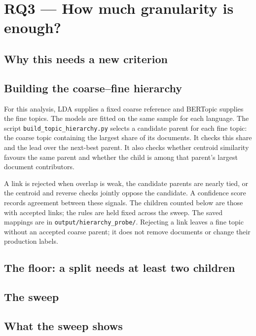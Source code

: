 \section{RQ3 --- How much granularity is enough?}
\label{sec:rq3}

\subsection{Why this needs a new criterion}

\subsection{Building the coarse--fine hierarchy}
\label{sec:rq3-hierarchy}

For this analysis, LDA supplies a fixed coarse reference and BERTopic supplies the fine
topics. The models are fitted on the same sample for each language. The script
\texttt{build\_topic\_hierarchy.py} selects a candidate parent for each fine topic: the coarse
topic containing the largest share of its documents. It checks this share and the lead over
the next-best parent. It also checks whether centroid similarity favours the same parent and
whether the child is among that parent's largest document contributors.

A link is rejected when overlap is weak, the candidate parents are nearly tied, or the
centroid and reverse checks jointly oppose the candidate. A confidence score records
agreement between these signals. The children counted below are those with accepted links;
the rules are held fixed across the sweep. The saved mappings are in
\texttt{output/hierarchy\_probe/}. Rejecting a link leaves a fine topic without an accepted
coarse parent; it does not remove documents or change their production labels.

\subsection{The floor: a split needs at least two children}

\subsection{The sweep}

\subsection{What the sweep shows}


